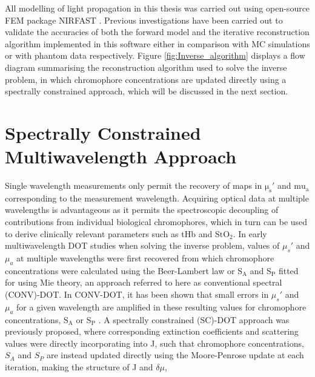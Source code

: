 \documentclass[twoside]{bhamthesis}
\theoremstyle{definition}
\begin{document}
All modelling of light propagation in this thesis was carried out using open-source FEM package NIRFAST \cite{dehghani2009near}. Previous investigations have been carried out to validate the accuracies of both the forward model and the iterative reconstruction algorithm implemented in this software either in comparison with MC simulations \cite{dehghani2003effects} or with phantom data \cite{dehghani2003multiwavelength} respectively. Figure \ref{fig:Inverse_algorithm} displays a flow diagram summarising the reconstruction algorithm used to solve the inverse problem, in which chromophore concentrations are updated directly using a spectrally constrained approach, which will be discussed in the next section.

\section{Spectrally Constrained Multiwavelength Approach}

\label{Spectrally Constrained Multiwavelength Approach}

Single wavelength measurements only permit the recovery of maps in $\mathrm{\mu_s'}$ and $\mathrm{mu_a}$ corresponding to the measurement wavelength. Acquiring optical data at multiple wavelengths is advantageous as it permits the spectroscopic decoupling of contributions from individual biological chromophores, which in turn can be used to derive clinically relevant parameters such as tHb and $\mathrm{StO_2}$. In early multiwavelength DOT studies when solving the inverse problem, values of $\mu_s'$ and $\mu_a$ at multiple wavelengths were first recovered from which chromophore concentrations were calculated using the Beer-Lambert law or $\mathrm{S_A}$ and $\mathrm{S_P}$ fitted for using Mie theory, an approach referred to here as conventional spectral (CONV)-DOT. In CONV-DOT, it has been shown that small errors in $\mu_s'$ and $\mu_a$ for a given wavelength are amplified in these resulting values for chromophore concentrations, $\mathrm{S_A}$ or $\mathrm{S_P}$  \cite{srinivasan2003validation}. A spectrally constrained (SC)-DOT approach was previously proposed, where corresponding extinction coefficients and scattering values were directly incorporating into J, such that chromophore concentrations, $S_A$ and $S_P$ are instead updated directly using the Moore-Penrose update at each iteration, making the structure of J and $\delta \mu$,
\end{document}
